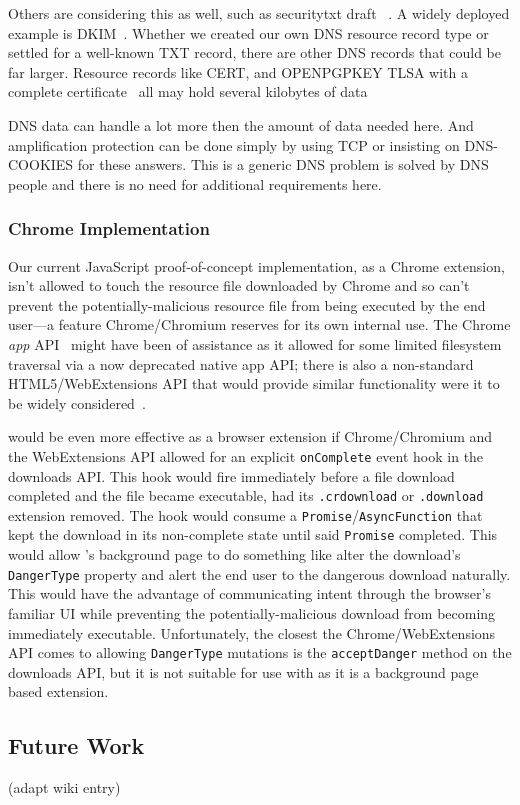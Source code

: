 Others are considering this as well, such as securitytxt draft
~\cite{draft-sectxt}. A widely deployed example is DKIM~\cite{DKIM}.
Whether we created our own DNS resource record type or settled for a well-known
TXT record, there are other DNS records that could be far larger. Resource
records like CERT, and OPENPGPKEY TLSA with a complete certificate~\cite{DANE1} all may hold several kilobytes of data

DNS data can handle a lot more then the amount of data needed here. And
amplification protection can be done simply by using TCP or insisting on
DNS-COOKIES for these answers. This is a generic DNS problem is solved by DNS
people and there is no need for additional requirements here.

\subsubsection{Chrome Implementation}

Our current JavaScript proof-of-concept implementation, as a Chrome extension,
isn't allowed to touch the resource file downloaded by Chrome and so can't
prevent the potentially-malicious resource file from being executed by the end
user—a feature Chrome/Chromium reserves for its own internal use. The Chrome
\textit{app} API~\cite{AppAPI} might have been of assistance as it allowed for some limited
filesystem traversal via a now deprecated native app API; there is also a
non-standard HTML5/WebExtensions API that would provide similar functionality
were it to be widely considered~\cite{deadSpec}.

\SYSTEM{} would be even more effective as a browser extension if Chrome/Chromium
and the WebExtensions API allowed for an explicit \texttt{onComplete} event hook
in the downloads API. This hook would fire immediately before a file download
completed and the file became executable, \ie had its \texttt{.crdownload} or
\texttt{.download} extension removed. The hook would consume a
\texttt{Promise}/\texttt{AsyncFunction} that kept the download in its
non-complete state until said \texttt{Promise} completed. This would allow
\SYSTEM{}'s background page to do something like alter the download's
\texttt{DangerType} property and alert the end user to the dangerous download
naturally. This would have the advantage of communicating intent through the
browser's familiar UI while preventing the potentially-malicious download from
becoming immediately executable. Unfortunately, the closest the
Chrome/WebExtensions API comes to allowing \texttt{DangerType} mutations is the
\texttt{acceptDanger} method on the downloads API, but it is not suitable for
use with \SYSTEM{} as it is a background page based extension.

\subsection{Future Work}

(adapt wiki entry)
